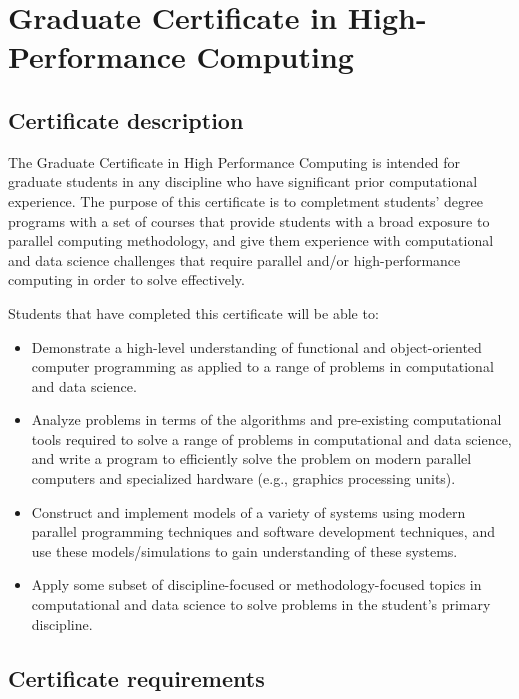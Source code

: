 \section{Graduate Certificate in High-Performance Computing}
\label{sec:cert_hpc}

\subsection{Certificate description}

The Graduate Certificate in High Performance Computing is intended for
graduate students in any discipline who have significant prior
computational experience.  The purpose of this certificate is to
completment students' degree programs with a set of courses that
provide students with a broad exposure to parallel computing
methodology, and give them experience with computational and data
science challenges that require parallel and/or high-performance
computing in order to solve effectively.

Students that have completed this certificate will be able to:

\begin{itemize}
\item  Demonstrate a high-level understanding of functional and
  object-oriented computer programming as applied to a range of
  problems in computational and data science.

\item  Analyze problems in terms of the algorithms and pre-existing
  computational tools required to solve a range of problems in
  computational and data science, and write a program to efficiently
  solve the problem on modern parallel computers and specialized
  hardware (e.g., graphics processing units).

\item  Construct and implement models of a variety of systems using
  modern parallel programming techniques and software development
  techniques, and use these models/simulations to gain understanding
  of these systems.

\item  Apply some subset of discipline-focused or methodology-focused
topics in computational and data science to solve problems in the
student’s primary discipline.

\end{itemize}

\subsection{Certificate requirements}

